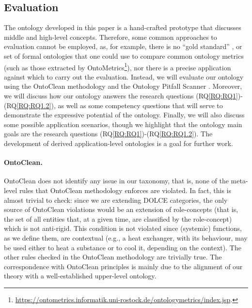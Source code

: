 \documentclass[sw]{iosart2x}
\newcommand{\RQLabel}{\textrm{RQ}}
\newcommand{\refRQ}[1]{({\RQLabel}\ref{#1})}
\newcommand{\DOLCE}{\textsc{DOLCE}\xspace} %
\newcommand{\qquotes}[1]{``#1''}
\begin{document}
\subsection{Evaluation}
The ontology developed in this paper is a hand-crafted prototype that discusses middle and high-level concepts. 
Therefore, some common approaches to evaluation cannot be employed, as, for example, there is no \qquotes{gold standard} \cite{sfarGoldStandardBased2016}, or set of formal ontologies that one could use to compare common ontology metrics (such as those extracted by OntoMetrics\footnote{\url{https://ontometrics.informatik.uni-rostock.de/ontologymetrics/index.jsp}.}), nor there is a precise application against which to carry out the evaluation. 
Instead, we will evaluate our ontology using the OntoClean methodology  \cite{guarinoOverviewOntoClean2009} and the Ontology Pitfall Scanner \cite{poveda2014oops}. 
Moreover, we will discuss how our ontology answers the research questions \refRQ{RQ:RQ1}-\refRQ{RQ:RQ1.2}, as well as some competency questions that will serve to demonstrate the expressive potential of the ontology.
Finally, we will also discuss some possible application scenarios, though we highlight that the ontology main goals are the research questions \refRQ{RQ:RQ1}-\refRQ{RQ:RQ1.2}. The development of derived application-level ontologies is a goal for further work.

\paragraph{OntoClean.} OntoClean does not identify any issue in our taxonomy, that is, none of the meta-level rules that OntoClean methodology enforces are violated.
In fact, this is almost trivial to check: since we are extending \DOLCE categories, the only source of OntoClean violations would be an extension of role-concepts (that is, the set of all entities that, at a given time, are classified by the role-concept) which is not anti-rigid. 
This condition is not violated since (systemic) functions, as we define them, are contextual (e.g., a heat exchanger, with its behaviour, may be used either to heat a substance or to cool it, depending on the context). The other rules checked in the OntoClean methodology are trivially true. 
The correspondence with OntoClean principles is mainly due to the alignment of our theory with a well-established upper-level ontology. 
\end{document}
